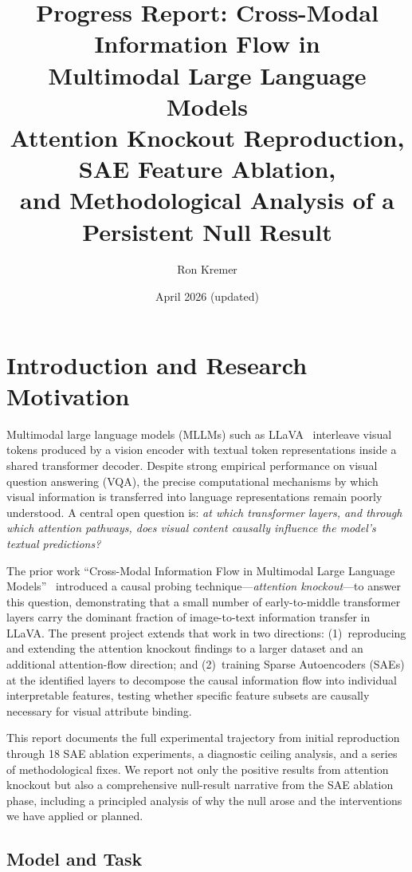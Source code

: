 \documentclass[11pt,a4paper]{article}
\title{\textbf{Progress Report: Cross-Modal Information Flow in\\
Multimodal Large Language Models}\\[0.5em]
\large Attention Knockout Reproduction, SAE Feature Ablation,\\
and Methodological Analysis of a Persistent Null Result}
\author{Ron Kremer}
\date{April 2026 (updated)}
\begin{document}
\maketitle
\tableofcontents
\newpage

\section{Introduction and Research Motivation}
\label{sec:intro}

Multimodal large language models (MLLMs) such as LLaVA~\citep{liu2023llava} interleave visual tokens produced
by a vision encoder with textual token representations inside a shared transformer decoder.
Despite strong empirical performance on visual question answering (VQA), the precise computational
mechanisms by which visual information is transferred into language representations remain poorly
understood.
A central open question is: \emph{at which transformer layers, and through which attention
pathways, does visual content causally influence the model's textual predictions?}

The prior work ``Cross-Modal Information Flow in Multimodal Large Language
Models''~\citep{crossmodal2024} introduced a causal probing technique—\emph{attention knockout}—to
answer this question, demonstrating that a small number of early-to-middle transformer layers carry
the dominant fraction of image-to-text information transfer in LLaVA.
The present project extends that work in two directions:
(1)~reproducing and extending the attention knockout findings to a larger dataset and an additional
attention-flow direction; and
(2)~training Sparse Autoencoders (SAEs) at the identified layers to decompose the causal information
flow into individual interpretable features, testing whether specific feature subsets are causally
necessary for visual attribute binding.

This report documents the full experimental trajectory from initial reproduction through 18 SAE
ablation experiments, a diagnostic ceiling analysis, and a series of methodological fixes.
We report not only the positive results from attention knockout but also a comprehensive
null-result narrative from the SAE ablation phase, including a principled analysis of why the null
arose and the interventions we have applied or planned.

\subsection{Model and Task}
\end{document}
